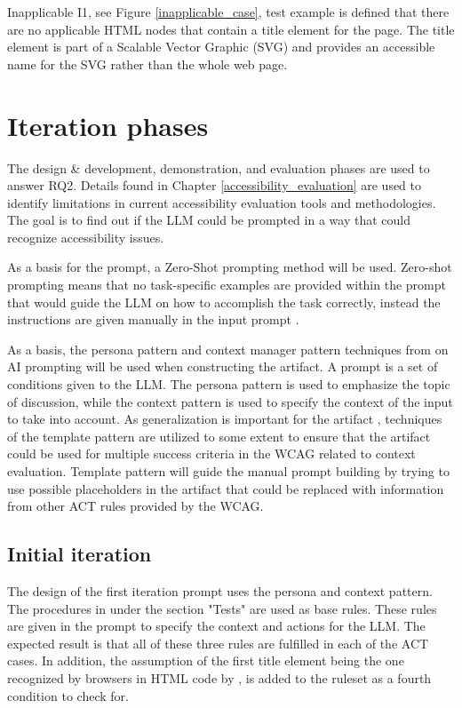 Inapplicable I1, see Figure \ref{inapplicable_case}, test example is defined that there are no applicable HTML nodes that contain a title element for the page. The title element is part of a Scalable Vector Graphic (SVG) and provides an accessible name for the SVG rather than the whole web page.


\section{Iteration phases}

The design \& development, demonstration, and evaluation phases are used to answer RQ2. Details found in Chapter \ref{accessibility_evaluation} are used to identify limitations in current accessibility evaluation tools and methodologies. The goal is to find out if the LLM could be prompted in a way that could recognize accessibility issues. 

As a basis for the prompt, a Zero-Shot prompting method will be used. Zero-shot prompting means that no task-specific examples are provided within the prompt that would guide the LLM on how to accomplish the task correctly, instead the instructions are given manually in the input prompt \citep{kojima2023large}.

As a basis, the persona pattern and context manager pattern techniques from \textcite{white2023prompt} on AI prompting will be used when constructing the artifact. A prompt is a set of conditions given to the LLM. The persona pattern is used to emphasize the topic of discussion, while the context pattern is used to specify the context of the input to take into account. As generalization is important for the artifact \citep{design_science_eval}, techniques of the template pattern are utilized to some extent to ensure that the artifact could be used for multiple success criteria in the WCAG related to context evaluation. Template pattern will guide the manual prompt building by trying to use possible placeholders in the artifact that could be replaced with information from other ACT rules provided by the WCAG.

\subsection{Initial iteration}

The design of the first iteration prompt uses the persona and context pattern. The procedures in \textcite{g88} under the section "Tests" are used as base rules. These rules are given in the prompt to specify the context and actions for the LLM. The expected result is that all of these three rules are fulfilled in each of the ACT cases. In addition, the assumption of the first title element being the one recognized by browsers in HTML code by \textcite{act_rule_g88}, is added to the ruleset as a fourth condition to check for.

